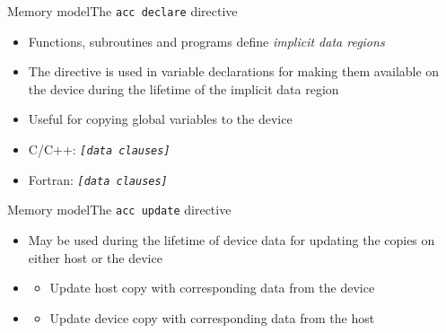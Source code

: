 \documentclass[12pt,aspectratio=169]{beamer}
\begin{document}
\begin{frame}[fragile]{Memory model}{The \texttt{acc declare} directive}
  \begin{itemize}
  \item Functions, subroutines and programs define \emph{implicit data regions}
  \item The  directive is used in variable declarations for making them available on the device during the lifetime of the implicit data region
  \item Useful for copying global variables to the device
    \vfill
  \item C/C++:  \emph{\texttt{[data clauses]}}
  \item Fortran:  \emph{\texttt{[data clauses]}}
  \end{itemize}
\end{frame}

\begin{frame}[fragile]{Memory model}{The \texttt{acc update} directive}
  \begin{itemize}
  \item May be used during the lifetime of device data for updating the copies on either host or the device
    \vfill
  \item {}
    \begin{itemize}
    \item Update host copy with corresponding data from the device
    \end{itemize}
    \vfill
  \item {}
    \begin{itemize}
    \item Update device copy with corresponding data from the host
    \end{itemize}
  \end{itemize}
\end{frame}
\end{document}
